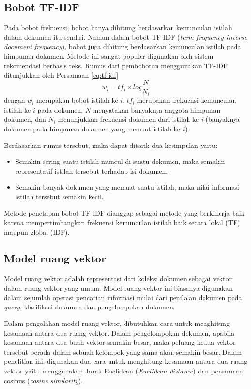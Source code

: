 \subsection{Bobot TF-IDF}
Pada bobot frekuensi, bobot hanya dihitung berdasarkan kemunculan istilah dalam dokumen itu sendiri. Namun dalam bobot TF-IDF (\textit{term frequency-inverse document frequency}), bobot juga dihitung berdasarkan kemunculan istilah pada himpunan dokumen. Metode ini sangat populer digunakan oleh sistem rekomendasi berbasis teks.\cite{aizawa2003information} Rumus dari pembobotan menggunakan TF-IDF ditunjukkan oleh Persamaan \ref{eq:tf-idf} 
\begin{equation}
\label{eq:tf-idf}
w_i=tf_i \times log \frac{N}{N_i}
\end{equation}
dengan $w_i$ merupakan bobot istilah ke-$i$, $tf_i$ merupakan frekuensi kemunculan istilah ke-$i$ pada dokumen, $N$ menyatakan banyaknya anggota himpunan dokumen, dan $N_i$ menunjukkan frekuensi dokumen dari istilah ke-$i$ (banyaknya dokumen pada himpunan dokumen yang memuat istilah ke-$i$).

Berdasarkan rumus tersebut, maka dapat ditarik dua kesimpulan yaitu:
\begin{itemize}
\item Semakin sering suatu istilah muncul di suatu dokumen, maka semakin representatif istilah tersebut terhadap isi dokumen.
\item Semakin banyak dokumen yang memuat suatu istilah, maka nilai informasi istilah tersebut semakin kecil.
\end{itemize}

Metode penetapan bobot TF-IDF dianggap sebagai metode yang berkinerja baik karena mempertimbangkan frekuensi kemunculan istilah baik secara lokal (TF) maupun global (IDF).


\subsection{Model ruang vektor}
Model ruang vektor adalah representasi dari koleksi dokumen sebagai vektor dalam ruang vektor yang umum.\cite{schutze2008introduction} Model ruang vektor ini biasanya digunakan dalam sejumlah operasi pencarian informasi mulai dari penilaian dokumen pada \textit{query}, klasifikasi dokumen dan pengelompokan dokumen.

Dalam pengolahan model ruang vektor, dibutuhkan cara untuk menghitung kesamaan antara dua ruang vektor. Dalam pengelompokan dokumen, apabila kesamaan antara dua buah vektor semakin besar, maka peluang kedua vektor tersebut berada dalam sebuah kelompok yang sama akan semakin besar. Dalam penelitian ini, digunakan dua cara untuk menghitung kesamaan antara dua ruang vektor yaitu menggunakan Jarak Euclidean (\textit{Euclidean distance}) dan persamaan cosinus (\textit{cosine similarity}).

